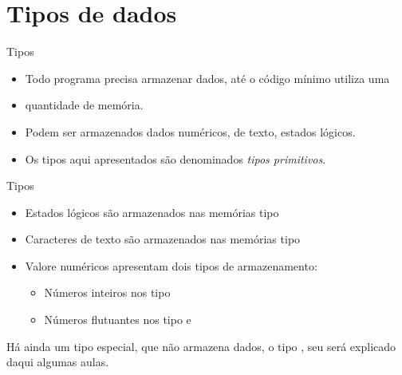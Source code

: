 \documentclass[11pt]{beamer}
\subtitle{Tipo assim\dots}
\begin{document}
\begin{frame}
	\titlepage
\end{frame}

\begin{frame}
	\tableofcontents
\end{frame}

\section{Tipos de dados}
	\begin{frame}{Tipos}
		\begin{itemize}
			\presentationPause\item Todo programa precisa armazenar dados, até o código mínimo utiliza uma \presentationPause\item quantidade de memória.
			\presentationPause\item Podem ser armazenados dados numéricos, de texto, estados lógicos.
			\presentationPause\item Os tipos aqui apresentados são denominados \emph{tipos primitivos}.
		\end{itemize}
	\end{frame}\begin{frame}{Tipos}
		\begin{itemize}
			\presentationPause\item Estados lógicos são armazenados nas memórias tipo 
			\presentationPause\item Caracteres de texto são armazenados nas memórias tipo 
			\presentationPause\item Valore numéricos apresentam dois tipos de armazenamento:
			\begin{itemize}
				\presentationPause\item Números inteiros nos tipo 
				\presentationPause\item Números flutuantes nos tipo  e 
			\end{itemize}
		\end{itemize}
		\presentationPause Há ainda um tipo especial, que não armazena dados, o tipo , seu será explicado daqui algumas aulas.
	\end{frame}
\end{document}
